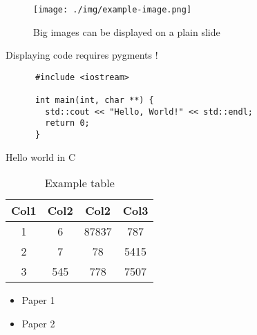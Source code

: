 \begin{plainslide}
  \begin{figure}[H]
    \begin{center}
      \texttt{[image: ./img/example-image.png]}
      \caption{Big images can be displayed on a plain slide}
    \end{center}
  \end{figure}
\end{plainslide}


\begin{subsectionslide}[containsverbatim]
  Displaying code requires pygments !

  \begin{listing}[H]
    \begin{verbatim}
      #include <iostream>

      int main(int, char **) {
        std::cout << "Hello, World!" << std::endl;
        return 0;
      }
    \end{verbatim}
    \caption{Hello world in C}
  \end{listing}

\end{subsectionslide}


\begin{subsectionslide}

  \begin{center}
    \begin{table}
      \begin{tabular}{|c|c|c|c|}
       \hline
       \rowcolor{tableFirstRowColor} Col1 & Col2 & Col2 & Col3 \\ [0.5ex]
       \hline
       \cellcolor{tableFirstColColor} 1 & 6 & 87837 & 787 \\
       \hline
       \cellcolor{tableFirstColColor} 2 & 7 & 78 & 5415 \\
       \hline
       \cellcolor{tableFirstColColor} 3 & 545 & 778 & 7507 \\
       \hline
      \end{tabular}
      \caption{Example table}
    \end{table}
  \end{center}

\end{subsectionslide}


\begin{subsectionslide}
  \begin{itemize}
    \item Paper 1 \cite{blattner2017model}
    \item Paper 2 \cite{bardakoff2020hedgehog}
  \end{itemize}
\end{subsectionslide}
